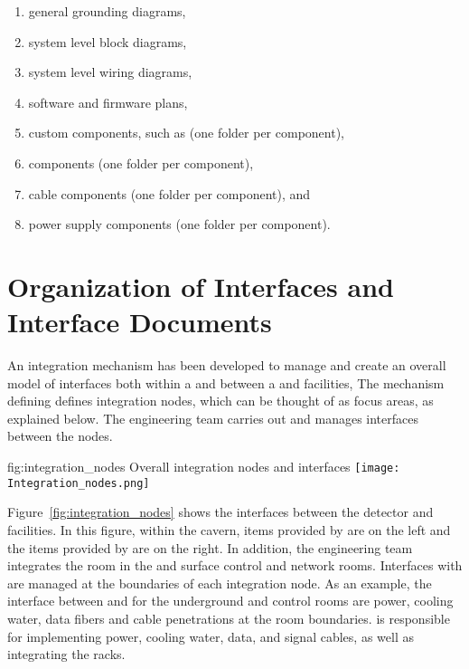 \begin{enumerate}
\begin{enumerate}
   \item general grounding diagrams,
   \item system level block diagrams,
   \item system level wiring diagrams,
   \item software and firmware plans,
   \item custom components, such as  (one folder per component),
   \item {} components (one folder per component),
   \item cable components (one folder per component), and
   \item power supply components (one folder per component).
 \end{enumerate}
\end{enumerate}


\section{Organization of Interfaces and Interface Documents}
\label{sec:fdsp-coord-integ-interface}

An integration mechanism has been developed to manage and create an overall model of interfaces both within a  and between a  and facilities,
The mechanism %
defining 
defines integration nodes, which can be thought of as focus areas, as
explained below.  The  engineering team carries out  and manages interfaces between the nodes.%


\begin{dunefigure}{fig:integration_nodes}
  {Overall integration nodes and interfaces}
  \texttt{[image: Integration\_nodes.png]}
\end{dunefigure}

Figure~\ref{fig:integration_nodes} shows the interfaces between the
detector and facilities. In this figure, within the cavern, items
provided by  are on the left and the items provided by
 are on the right. In addition, the  engineering
team integrates the  room in the  and
surface control and network rooms.  Interfaces with  are
managed at the boundaries of each integration node. As an example, the
interface between  and  for the underground
 and control rooms are power, cooling water, data fibers
and cable penetrations at the room boundaries.  is responsible 
for implementing power,
cooling water, data, and signal cables, as well as integrating the
racks. %


